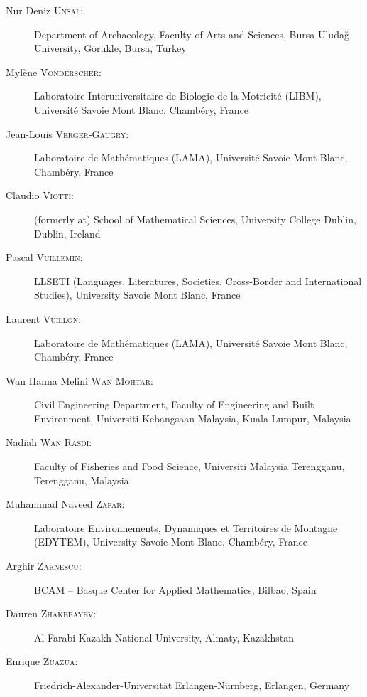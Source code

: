 \begin{description}
  \item[Nur Deniz \textsc{\"Unsal}:] Department of Archaeology, Faculty of Arts and Sciences, Bursa Uluda\u{g} University, G\"or\"ukle, Bursa, Turkey
  \item[Myl\`ene \textsc{Vonderscher}:] Laboratoire Interuniversitaire de Biologie de la Motricit\'e (LIBM), Universit\'e Savoie Mont Blanc, Chamb\'ery, France
  \item[Jean-Louis \textsc{Verger-Gaugry}:] Laboratoire de Math\'ematiques (LAMA), Universit\'e Savoie Mont Blanc, Chamb\'ery, France
  \item[Claudio \textsc{Viotti}:] (formerly at) School of Mathematical Sciences, University College Dublin, Dublin, Ireland
  \item[Pascal \textsc{Vuillemin}:] LLSETI (Languages, Literatures, Societies. Cross-Border and International Studies), University Savoie Mont Blanc, France
  \item[Laurent \textsc{Vuillon}:] Laboratoire de Math\'ematiques (LAMA), Universit\'e Savoie Mont Blanc, Chamb\'ery, France
  \item[Wan Hanna Melini \textsc{Wan Mohtar}:] Civil Engineering Department, Faculty of Engineering and Built Environment, Universiti Kebangsaan Malaysia, Kuala Lumpur, Malaysia
  \item[Nadiah \textsc{Wan Rasdi}:] Faculty of Fisheries and Food Science, Universiti Malaysia Terengganu, Terengganu, Malaysia
  \item[Muhammad Naveed \textsc{Zafar}:] Laboratoire Environnements, Dynamiques et Territoires de Montagne (EDYTEM), University Savoie Mont Blanc, Chamb\'ery, France 
  \item[Arghir \textsc{Zarnescu}:] BCAM -- Basque Center for Applied Mathematics, Bilbao, Spain
  \item[Dauren \textsc{Zhakebayev}:] Al-Farabi Kazakh National University, Almaty, Kazakhstan
  \item[Enrique \textsc{Zuazua}:] Friedrich-Alexander-Universität Erlangen-Nürnberg, Erlangen, Germany
\end{description}